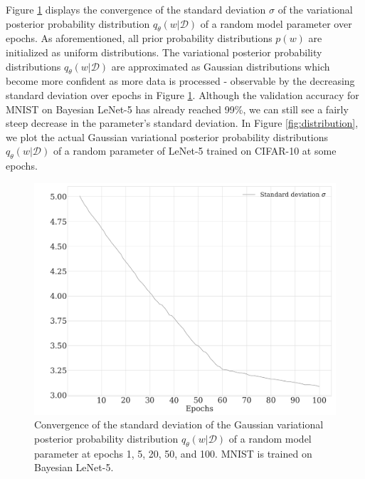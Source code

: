 %
\newline Figure \ref{fig:std_CNN} displays the convergence of the standard deviation $\sigma$ of the variational posterior probability distribution $q_{\theta}(w|\mathcal{D})$ of a random model parameter over epochs. As aforementioned, all prior probability distributions $p(w)$ are initialized as uniform distributions. The variational posterior probability distributions $q_{\theta}(w|\mathcal{D})$ are approximated as Gaussian distributions which become more confident as more data is processed - observable by the decreasing standard deviation over epochs in Figure \ref{fig:std_CNN}. Although the validation accuracy for MNIST on Bayesian LeNet-5 has already reached 99\%, we can still see a fairly steep decrease in the parameter's standard deviation. In Figure \ref{fig:distribution}, we plot the actual Gaussian variational posterior probability distributions $q_{\theta}(w|\mathcal{D})$ of a random parameter of LeNet-5 trained on CIFAR-10 at some epochs.
%
\begin{figure}[b!] 
\begin{center}
\includegraphics[width=\linewidth]{Chapter5/Figs/std_CNN.png}
\caption{Convergence of the standard deviation of the Gaussian variational posterior probability distribution $q_{\theta}(w|\mathcal{D})$ of a random model parameter at epochs 1, 5, 20, 50, and 100. MNIST is trained on Bayesian LeNet-5.}
\label{fig:std_CNN}
\end{center}
\end{figure} 
%
